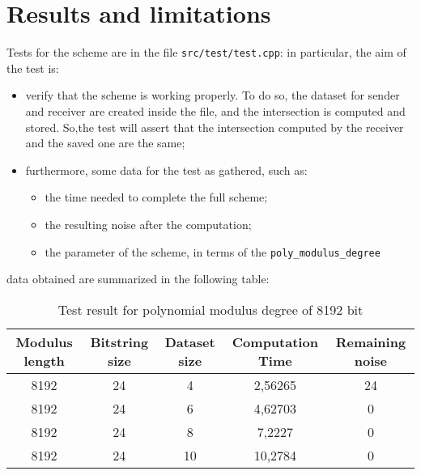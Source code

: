 \documentclass[12pt]{extarticle}
\begin{document}
\section{Results and limitations}
Tests for the scheme are in the file \texttt{src/test/test.cpp}: in particular, the aim of the test is:
\begin{itemize}
    \item verify that the scheme is working properly. To do so, the dataset for sender and receiver are created inside the file, and the intersection is computed and stored. So,the test will assert that the intersection computed by the receiver and the saved one are the same;
    \item furthermore, some data for the test as gathered, such as:
        \begin{itemize}
            \item the time needed to complete the full scheme;
            \item the resulting noise after the computation;
            \item the parameter of the scheme, in terms of the \texttt{poly\_modulus\_degree} 
        \end{itemize}
\end{itemize}
data obtained are summarized in the following table:\\
\begin{table}[h]
    \begin{tabular}{||c|c|c|c|c||}
    	\hline
        Modulus length & Bitstring size	& Dataset size	& Computation Time	& Remaining noise\\
        \hline\hline
        8192 & 24 & 4 & 2,56265 & 24\\
        \hline
        8192 & 24 & 6 & 4,62703	& 0 \\
        \hline
        8192 & 24 & 8 & 7,2227 & 0 \\
        \hline
        8192 & 24 & 10 & 10,2784 & 0 \\
        \hline
    \end{tabular}
	\caption{Test result for polynomial modulus degree of 8192 bit}
\end{table}
\end{document}
